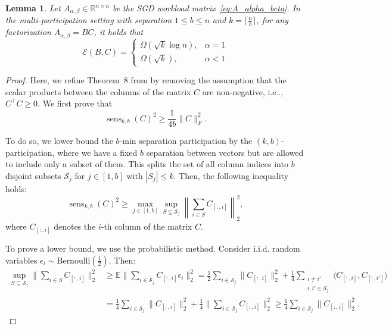 \documentclass{article} %
\makeatletter
\newtheorem{lemma}{Lemma}
\DeclareRobustCommand\onedot{\futurelet\@let@token\@onedot}
\def\@onedot{\ifx\@let@token.\else.\null\fi\xspace}
\def\ie{{i.e}\onedot} \def\Ie{{I.e}\onedot}
\newcommand{\R}{\mathbb{R}}
\newcommand{\senskb}{\operatorname{sens}_{k, b}}
\makeatother
\begin{document}
\begin{lemma}
\label{lem:k_b_lower_bound_new}
    Let $A_{\alpha, \beta} \in \R^{n \times n}$ be the SGD workload matrix~\eqref{eq:A_alpha_beta}.
    In the multi-participation setting with separation $1 \le b \leq n$ and $k = \lceil\frac{n}{b}\rceil$,
    for any factorization $A_{\alpha, \beta} = BC$, it holds that
    \begin{equation}
        \mathcal{E}(B, C) = \begin{cases} \Omega(\sqrt{k} \log n), &\alpha = 1\\
        \Omega(\sqrt{k}), &\alpha < 1
        \end{cases}
    \end{equation}
\end{lemma}

\begin{proof}
Here, we refine Theorem~8 from \citet{kalinin2024} by removing the assumption that the scalar products between the columns of the matrix $C$ are non-negative, \ie, $C^{\top}C \ge 0$. We first prove that
\begin{equation}
    \senskb(C)^2 \ge \frac{1}{4b} \|C\|_F^2.
\end{equation}


To do so, we lower bound the $b$-min separation participation by the $(k, b)$-participation, where we have a fixed $b$ separation between vectors but are allowed to include only a subset of them. This splits the set of all column indices into $b$ disjoint subsets $\mathcal{S}_j$ for $j \in [1, b]$ with $|S_j| \le k$. Then, the following inequality holds:
    \begin{equation}
        \senskb(C)^2 \ge \max_{j \in [1, b]} \sup_{S \subseteq \mathcal{S}_j} \left\| \sum_{i \in S} C_{[:, i]} \right\|_2^2,
    \end{equation}
    where $C_{[:, i]}$ denotes the $i$-th column of the matrix $C$. 

    To prove a lower bound, we use the probabilistic method. Consider i.i.d. random variables $\epsilon_i \sim \text{Bernoulli}(\frac{1}{2})$. Then:
    \begin{equation}
    \begin{aligned}
        \sup_{S \subseteq \mathcal{S}_j} \Big\| \sum_{i \in S} C_{[:, i]} \Big\|_2^2 &\ge \mathbb{E} \Big\| \sum_{i \in \mathcal{S}_j} C_{[:, i]} \epsilon_i \Big\|_2^2 = \frac{1}{2} \sum_{i \in \mathcal{S}_j} \|C_{[:, i]}\|_2^2 + \frac{1}{4} \sum_{\substack{i \ne i' \\ i, i' \in \mathcal{S}_j}} \langle C_{[:, i]}, C_{[:, i']} \rangle \\
        &= \frac{1}{4} \sum_{i \in \mathcal{S}_j} \|C_{[:, i]}\|_2^2 + \frac{1}{4} \Big\| \sum_{i \in \mathcal{S}_j} C_{[:, i]} \Big\|_2^2 \ge \frac{1}{4} \sum_{i \in \mathcal{S}_j} \|C_{[:, i]}\|_2^2.
    \end{aligned}
    \end{equation}


\end{proof}
\end{document}
